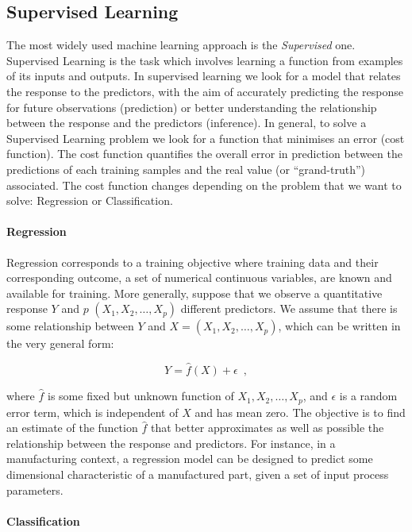\subsection{Supervised Learning}

The most widely used machine learning approach is the \textit{Supervised} one. Supervised Learning is the task which involves learning a function from examples of its inputs and outputs. In supervised learning we look for a model that relates the response to the predictors, with the aim of accurately predicting the response for future observations (prediction) or better understanding the relationship between the response and the predictors (inference). In general, to solve a Supervised Learning problem we look for a function that minimises an error (cost function). The cost function quantifies the overall error in prediction between the predictions of each training samples and the real value (or “grand-truth”) associated. The cost function changes depending on the problem that we want to solve: Regression or Classification.

\paragraph{Regression} \label{Regression}

Regression corresponds to a training objective where training data and their corresponding
outcome, a set of numerical continuous variables, are known and available for training. More generally, suppose that we observe a quantitative response $Y$ and $p$ $(X_1,X_2,\ldots,X_p)$ different predictors. We assume that there is some relationship between $Y$ and $X = (X_1,X_2,\ldots,X_p)$, which can be written in the very general form: 

\begin{equation}
  Y=\hat{f}(X)+ \epsilon
  \enspace,
\end{equation}

where $\hat{f}$ is some fixed but unknown function of $X_1,X_2,\ldots,X_p$, and $\epsilon$ is a random error term, which is independent of $X$ and has mean zero. The objective is to find an estimate of the function $\hat{f}$ that better approximates as well as possible the relationship between the response and predictors. For instance, in a manufacturing context, a regression model can be designed to predict some dimensional characteristic of a manufactured part, given a set of input process parameters.

\paragraph{Classification} \label{Classification}

